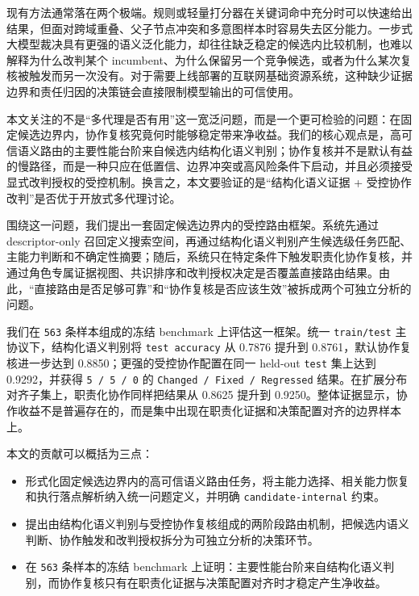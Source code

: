 \documentclass[11pt,a4paper]{ctexart}
\begin{document}
现有方法通常落在两个极端。规则或轻量打分器在关键词命中充分时可以快速给出结果，但面对跨域重叠、父子节点冲突和多意图样本时容易失去区分能力。一步式大模型裁决具有更强的语义泛化能力，却往往缺乏稳定的候选内比较机制，也难以解释为什么改判某个 incumbent、为什么保留另一个竞争候选，或者为什么某次复核被触发而另一次没有。对于需要上线部署的互联网基础资源系统，这种缺少证据边界和责任归因的决策链会直接限制模型输出的可信使用。

本文关注的不是“多代理是否有用”这一宽泛问题，而是一个更可检验的问题：在固定候选边界内，协作复核究竟何时能够稳定带来净收益。我们的核心观点是，高可信语义路由的主要性能台阶来自候选内结构化语义判别；协作复核并不是默认有益的慢路径，而是一种只应在低置信、边界冲突或高风险条件下启动，并且必须接受显式改判授权的受控机制。换言之，本文要验证的是“结构化语义证据 + 受控协作改判”是否优于开放式多代理讨论。

围绕这一问题，我们提出一套固定候选边界内的受控路由框架。系统先通过 descriptor-only 召回定义搜索空间，再通过结构化语义判别产生候选级任务匹配、主能力判断和不确定性摘要；随后，系统只在特定条件下触发职责化协作复核，并通过角色专属证据视图、共识排序和改判授权决定是否覆盖直接路由结果。由此，“直接路由是否足够可靠”和“协作复核是否应该生效”被拆成两个可独立分析的问题。

我们在 \texttt{563} 条样本组成的冻结 benchmark 上评估这一框架。统一 \texttt{train/test} 主协议下，结构化语义判别将 \texttt{test accuracy} 从 0.7876 提升到 0.8761，默认协作复核进一步达到 0.8850；更强的受控协作配置在同一 held-out \texttt{test} 集上达到 0.9292，并获得 \texttt{5 / 5 / 0} 的 \texttt{Changed / Fixed / Regressed} 结果。在扩展分布对齐子集上，职责化协作同样把结果从 0.8625 提升到 0.9250。整体证据显示，协作收益不是普遍存在的，而是集中出现在职责化证据和决策配置对齐的边界样本上。

本文的贡献可以概括为三点：
\begin{itemize}[leftmargin=1.5em,itemsep=0.15em,topsep=0.25em]
\item 形式化固定候选边界内的高可信语义路由任务，将主能力选择、相关能力恢复和执行落点解析纳入统一问题定义，并明确 \texttt{candidate-internal} 约束。
\item 提出由结构化语义判别与受控协作复核组成的两阶段路由机制，把候选内语义判断、协作触发和改判授权拆分为可独立分析的决策环节。
\item 在 \texttt{563} 条样本的冻结 benchmark 上证明：主要性能台阶来自结构化语义判别，而协作复核只有在职责化证据与决策配置对齐时才稳定产生净收益。
\end{itemize}
\end{document}
